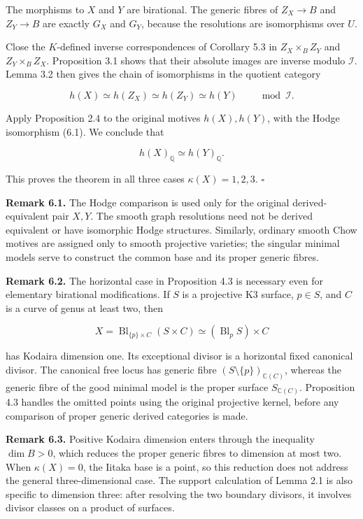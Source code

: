 \documentclass[11pt,a4paper]{article}
\begin{document}
The morphisms to $X$ and $Y$ are birational. The generic fibres of $Z_X\to B$ and $Z_Y\to B$ are exactly $G_X$ and $G_Y$, because the resolutions are isomorphisms over $U$.

Close the $K$-defined inverse correspondences of Corollary 5.3 in $Z_X\times_B Z_Y$ and $Z_Y\times_B Z_X$. Proposition 3.1 shows that their absolute images are inverse modulo $\mathcal I$. Lemma 3.2 then gives the chain of isomorphisms in the quotient category

\begin{equation*}
h(X)\simeq h(Z_X)\simeq h(Z_Y)\simeq h(Y)
\qquad\bmod\mathcal I.
\tag{6.2}
\end{equation*}

Apply Proposition 2.4 to the original motives $h(X),h(Y)$, with the Hodge isomorphism (6.1). We conclude that

\begin{equation*}
h(X)_{\mathbb Q}\simeq h(Y)_{\mathbb Q}.
\end{equation*}

This proves the theorem in all three cases $\kappa(X)=1,2,3$. $\square$

\noindent \textbf{Remark 6.1.} The Hodge comparison is used only for the original derived-equivalent pair $X,Y$. The smooth graph resolutions need not be derived equivalent or have isomorphic Hodge structures. Similarly, ordinary smooth Chow motives are assigned only to smooth projective varieties; the singular minimal models serve to construct the common base and its proper generic fibres.

\noindent \textbf{Remark 6.2.} The horizontal case in Proposition 4.3 is necessary even for elementary birational modifications. If $S$ is a projective K3 surface, $p\in S$, and $C$ is a curve of genus at least two, then

\begin{equation*}
X=\operatorname{Bl}_{\{p\}\times C}(S\times C)
\simeq(\operatorname{Bl}_pS)\times C
\end{equation*}

has Kodaira dimension one. Its exceptional divisor is a horizontal fixed canonical divisor. The canonical free locus has generic fibre $(S\setminus\{p\})_{\mathbb C(C)}$, whereas the generic fibre of the good minimal model is the proper surface $S_{\mathbb C(C)}$. Proposition 4.3 handles the omitted points using the original projective kernel, before any comparison of proper generic derived categories is made.

\noindent \textbf{Remark 6.3.} Positive Kodaira dimension enters through the inequality $\dim B>0$, which reduces the proper generic fibres to dimension at most two. When $\kappa(X)=0$, the Iitaka base is a point, so this reduction does not address the general three-dimensional case. The support calculation of Lemma 2.1 is also specific to dimension three: after resolving the two boundary divisors, it involves divisor classes on a product of surfaces.
\end{document}
